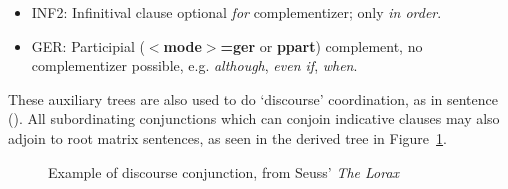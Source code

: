 \begin{itemize}
\item INF2: Infinitival clause optional {\it for} complementizer; only {\it
in order}.
\begin{itemize}
\end{itemize}

\item GER: Participial ({\bf $<$mode$>$=ger} or {\bf ppart}) complement, no
complementizer possible, e.g. {\it although}, {\it even if}, {\it
when}. 
\begin{itemize}
\end{itemize}

\end{itemize}

These auxiliary trees are also used to do `discourse' coordination, as in
sentence ().  All subordinating conjunctions which can conjoin indicative
clauses may also adjoin to root matrix sentences, as seen in the derived tree
in Figure~\ref{seuss-sentence}.


\begin{figure}[htb]
\centering
\hspace{0in}
\caption{Example of discourse conjunction, from Seuss' {\it The
Lorax}\nocite{seuss71}}
\label{seuss-sentence}
\end{figure}






